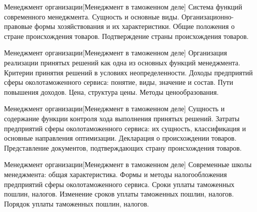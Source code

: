 \documentclass[
	11pt,
	a4paper,
	]
	{article}
\begin{document}
\vfill



\begin{minipage}[t][\miniH]{\miniL}\centering
	 {Менеджмент организации}[Менеджмент в таможенном деле]
		{
			Система функций современного менеджмента. Сущность и основные виды.
		}{
			Организационно-правовые формы хозяйствования и их характеристики.
		}{
			Общие положения о стране происхождения товаров. Подтверждение страны происхождения товаров.
		}
	\lowGE
\end{minipage}

\vfill



\begin{minipage}[t][\miniH]{\miniL}\centering
	 {Менеджмент организации}[Менеджмент в таможенном деле]
		{
			Организация реализации принятых решений как одна из основных функций менеджмента. Критерии принятия решений в условиях неопределенности.
		}{
			Доходы предприятий сферы околотаможенного сервиса: понятие, виды, значение и состав. Пути повышения доходов.
		}{
			Цена, структура цены. Методы ценообразования.
		}
	\lowGE
\end{minipage}





\begin{minipage}[t][\miniH]{\miniL}\centering
	 {Менеджмент организации}[Менеджмент в таможенном деле]
		{
			Сущность и содержание функции контроля хода выполнения принятых решений.
		}{
			Затраты предприятий сферы околотаможенного сервиса: их сущность, классификация и основные направления оптимизации.
		}{
			Декларация о происхождении товаров. Представление документов, подтверждающих страну происхождения товаров.
		}
	\lowGE
\end{minipage}

\vfill



\begin{minipage}[t][\miniH]{\miniL}\centering
	 {Менеджмент организации}[Менеджмент в таможенном деле]
		{
			Современные школы менеджмента: общая характеристика.
		}{
			Формы и методы налогообложения предприятий сферы околотаможенного сервиса.
		}{
			Сроки уплаты таможенных пошлин, налогов. Изменение сроков уплаты таможенных пошлин, налогов. Порядок уплаты таможенных пошлин, налогов.
		}
	\lowGE
\end{minipage}
\end{document}
